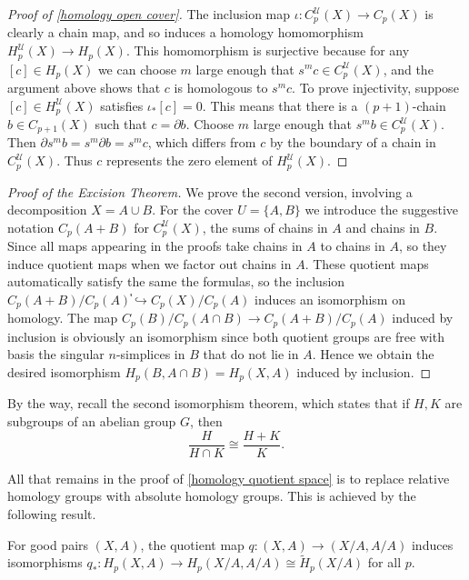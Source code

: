 \begin{proof}[Proof of \cref{homology open cover}]
The inclusion map $\iota:C^\mathcal{U}_p(X)\to C_p(X)$ is clearly a chain map, and so induces a homology homomorphism $H^\mathcal{U}_p(X)\to H_p(X)$. This homomorphism is surjective because for any $[c]\in H_p(X)$ we can choose $m$ large enough that $s^mc\in C^\mathcal{U}_p(X)$, and the argument above shows that $c$ is homologous to $s^mc$. To prove injectivity, suppose $[c]\in H^\mathcal{U}_p(X)$ satisfies $\iota_*[c]=0$. This means that there is a $(p+1)$-chain $b\in C_{p+1}(X)$ such that $c=\partial b$. Choose $m$ large enough that $s^mb\in C^\mathcal{U}_p(X)$. Then $\partial s^mb=s^m\partial b=s^mc$, which differs from $c$ by the boundary of a chain in $C^\mathcal{U}_p(X)$.
Thus $c$ represents the zero element of $H^\mathcal{U}_p(X)$.
\end{proof}
\begin{proof}[Proof of the Excision Theorem]
We prove the second version, involving a decomposition $X=A\cup B$. For the cover $U=\{A,B\}$ we introduce the suggestive notation $C_p(A+B)$ for $C^\mathcal{U}_p(X)$, the sums of chains in $A$ and chains in $B$. Since all maps appearing in the proofs take chains in $A$ to chains in $A$, so they induce quotient maps when we factor out chains in $A$. These quotient maps automatically satisfy the same the formulas, so the inclusion $C_p(A+B)/C_p(A)֓\hookrightarrow C_p(X)/C_p(A)$ induces an isomorphism on homology. The map $C_p(B)/C_p(A\cap B)\to C_p(A+B)/C_p(A)$ induced by inclusion is obviously an isomorphism since both quotient groups are free with basis the singular $n$-simplices in $B$ that do not lie in $A$. Hence we obtain the desired isomorphism $H_p(B,A\cap B)=H_p(X,A)$ induced by inclusion.
\end{proof}
\begin{remark}
By the way, recall the second isomorphism theorem, which states that if $H,K$ are subgroups of an abelian group $G$, then
\[\dfrac{H}{H\cap K}\cong\dfrac{H+K}{K}.\]
\end{remark}
All that remains in the proof of \cref{homology quotient space} is to replace relative homology groups with absolute homology groups. This is achieved by the following result.
\begin{proposition}\label{homology reduced and quotient}
For good pairs $(X,A)$, the quotient map $q:(X,A)\to(X/A,A/A)$
induces isomorphisms $q_*:H_p(X,A)\to H_p(X/A,A/A)\cong\widetilde{H}_p(X/A)$ for all $p$.
\end{proposition}
